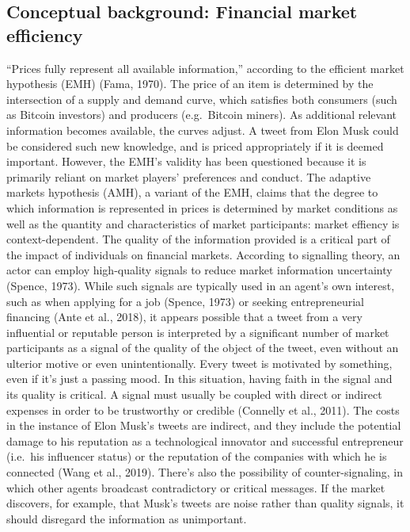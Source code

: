 \documentclass[
]{article}
\begin{document}
\hypertarget{conceptual-background-financial-market-efficiency}{%
\subsection{Conceptual background: Financial market
efficiency}\label{conceptual-background-financial-market-efficiency}}

``Prices fully represent all available information,'' according to the
efficient market hypothesis (EMH) (Fama, 1970). The price of an item is
determined by the intersection of a supply and demand curve, which
satisfies both consumers (such as Bitcoin investors) and producers
(e.g.~Bitcoin miners). As additional relevant information becomes
available, the curves adjust. A tweet from Elon Musk could be considered
such new knowledge, and is priced appropriately if it is deemed
important. However, the EMH's validity has been questioned because it is
primarily reliant on market players' preferences and conduct. The
adaptive markets hypothesis (AMH), a variant of the EMH, claims that the
degree to which information is represented in prices is determined by
market conditions as well as the quantity and characteristics of market
participants: market effiency is context-dependent. The quality of the
information provided is a critical part of the impact of individuals on
financial markets. According to signalling theory, an actor can employ
high-quality signals to reduce market information uncertainty (Spence,
1973). While such signals are typically used in an agent's own interest,
such as when applying for a job (Spence, 1973) or seeking
entrepreneurial financing (Ante et al., 2018), it appears possible that
a tweet from a very influential or reputable person is interpreted by a
significant number of market participants as a signal of the quality of
the object of the tweet, even without an ulterior motive or even
unintentionally. Every tweet is motivated by something, even if it's
just a passing mood. In this situation, having faith in the signal and
its quality is critical. A signal must usually be coupled with direct or
indirect expenses in order to be trustworthy or credible (Connelly et
al., 2011). The costs in the instance of Elon Musk's tweets are
indirect, and they include the potential damage to his reputation as a
technological innovator and successful entrepreneur (i.e.~his influencer
status) or the reputation of the companies with which he is connected
(Wang et al., 2019). There's also the possibility of counter-signaling,
in which other agents broadcast contradictory or critical messages. If
the market discovers, for example, that Musk's tweets are noise rather
than quality signals, it should disregard the information as
unimportant.
\end{document}
